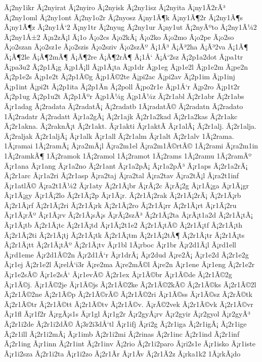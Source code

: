 {Ã¡2ny1ikr
Ã¡2nyirat
Ã¡2nyiro
Ã¡2nyisk
Ã¡2ny1isz
Ã¡2nyita
Ã¡ny1Ã­2rÃ³
Ã¡2ny1oml
Ã¡2ny1ont
Ã¡2ny1o2r
Ã¡2nyosz
Ã¡ny1Ã¶k
Ã¡ny1Ã¶2r
Ã¡2ny1Ã¶s
Ã¡ny1Ã¶z
Ã¡2ny1Å‘2
Ã¡ny1tr
Ã¡2nyug
Ã¡2ny1ur
Ã¡ny1ut
Ã¡2nyÃºto
Ã¡2ny1Ã¼2
Ã¡2ny1Å±2
Ã¡n2zÃ¡l
Ã¡1o
Ã¡o2cs
Ã¡o2kÃ¡
Ã¡o2ko
Ã¡o2mo
Ã¡o2pe
Ã¡o2so
Ã¡o2szan
Ã¡o2sz1e
Ã¡o2szis
Ã¡o2sziv
Ã¡o2szÃº
Ã¡1Ã³
Ã¡Ã³2ha
Ã¡Ã³2va
Ã¡1Ã¶
Ã¡Ã¶2le
Ã¡Ã¶2mÃ¶
Ã¡Ã¶2re
Ã¡Ã¶2rÃ¶
Ã¡1Å‘
Ã¡Å‘2sz
Ã¡2p1a2dot
Ã¡pa1tr
Ã¡pa3u2
Ã¡2p1Ã¡g
Ã¡p1Ã¡ll
Ã¡p1Ã¡ta
Ã¡p1dr
Ã¡p1eg
Ã¡p1e2l
Ã¡p1e2m
Ã¡pe2n
Ã¡2p1e2s
Ã¡p1e2t
Ã¡2p1Ã©g
Ã¡p1Ã©2te
Ã¡pi2ac
Ã¡pi2av
Ã¡2p1im
Ã¡p1inj
Ã¡p1int
Ã¡pi2t
Ã¡2p1ita
Ã¡2p1Ã­n
Ã¡2poll
Ã¡po2r1e
Ã¡p1Å‘r
Ã¡p2ro
Ã¡p1t2r
Ã¡2p1ug
Ã¡2p1u2t
Ã¡2p1Ãºr
Ã¡p1Ã¼g
Ã¡p1Ã¼z
Ã¡2r1abl
Ã¡2r1abr
Ã¡2r1abs
Ã¡r1adag
Ã¡2radata
Ã¡2radatÃ¡
Ã¡2radatb
1Ã¡radatÃ©
Ã¡2radatn
Ã¡2radato
1Ã¡2radatr
Ã¡2radatt
Ã¡r1a2gÃ¡
Ã¡2r1ajk
Ã¡2r1a2kad
Ã¡2r1a2kas
Ã¡2r1akc
Ã¡2r1akna.
Ã¡2raknÃ¡t
Ã¡2r1akt.
Ã¡r1akti
Ã¡r1aktÃ­
Ã¡r1alÃ¡
Ã¡2r1alj.
Ã¡2r1alja.
Ã¡2raljak
Ã¡2r1aljÃ¡
Ã¡r1alk
Ã¡r1all
Ã¡2r1alm
Ã¡r1alt
Ã¡2r1alv
1Ã¡2rama.
1Ã¡ramai
1Ã¡2ramÃ¡
Ã¡ra2mÃ¡l
Ã¡ra2m1el
Ã¡ra2m1Ã©rtÃ©
1Ã¡2rami
Ã¡ra2m1in
1Ã¡2ramkÃ¶
1Ã¡2ramok
1Ã¡2ramol
1Ã¡2ramot
1Ã¡2rams
1Ã¡2ramu
1Ã¡2ramÃº
Ã¡r1ana
Ã¡r1ang
Ã¡r1a2no
Ã¡2r1ant
Ã¡r1a2pÃ¡
Ã¡r1a2pÃ³
Ã¡r1aps
Ã¡2r1a2rÃ¡
Ã¡2r1arc
Ã¡r1a2ri
Ã¡2r1asp
Ã¡ra2taj
Ã¡ra2tal
Ã¡ra2tav
Ã¡ra2tÃ¡l
Ã¡ra2t1inf
Ã¡r1atlÃ©
Ã¡ra2t1Ã¼2
Ã¡r1aty
Ã¡2r1Ã¡br
Ã¡rÃ¡2c
Ã¡rÃ¡2g
Ã¡r1Ã¡ga
Ã¡r1Ã¡gr
Ã¡r1Ã¡gy
Ã¡r1Ã¡2lo
Ã¡2r1Ã¡2p
Ã¡r1Ã¡r.
Ã¡2r1Ã¡2rak
Ã¡2r1Ã¡2rÃ¡
Ã¡2r1Ã¡rb
Ã¡2r1Ã¡rf
Ã¡2r1Ã¡2ri
Ã¡2r1Ã¡rk
Ã¡2r1Ã¡2ro
Ã¡2r1Ã¡rr
Ã¡2r1Ã¡rt
Ã¡r1Ã¡2ru
Ã¡r1Ã¡rÃº
Ã¡r1Ã¡rv
Ã¡2r1Ã¡sÃ¡s
Ã¡rÃ¡2szÃ³
Ã¡2r1Ã¡2ta
Ã¡rÃ¡t1a2d
Ã¡2r1Ã¡tÃ¡
Ã¡r1Ã¡tb
Ã¡2r1Ã¡tc
Ã¡2r1Ã¡td
Ã¡r1Ã¡2t1e2
Ã¡2r1Ã¡tÃ©
Ã¡2r1Ã¡tf
Ã¡2r1Ã¡th
Ã¡2r1Ã¡2ti
Ã¡2r1Ã¡tj
Ã¡2r1Ã¡tk
Ã¡2r1Ã¡tm
Ã¡2r1Ã¡2tÃ¶
Ã¡2r1Ã¡tr
Ã¡2r1Ã¡ts
Ã¡2r1Ã¡tt
Ã¡2r1Ã¡tÃº
Ã¡2r1Ã¡tv
Ã¡r1bl
1Ã¡rboc
Ã¡r1br
Ã¡r2d1Ã¡l
Ã¡rd1ell
Ã¡rd1eme
Ã¡r2d1Ã©2n
Ã¡r2d1Å‘r
Ã¡r1drÃ¡
Ã¡r2dud
Ã¡re2Ã¡
Ã¡r1e2d
Ã¡2r1e2g
Ã¡r1ej
Ã¡2r1e2l
Ã¡relÅ‘i3r
Ã¡re2ma
Ã¡re2mÃ©l
Ã¡re2n
Ã¡r1ene
Ã¡r1eng
Ã¡2r1e2r
Ã¡r1e2sÃ©
Ã¡r1e2sÅ‘
Ã¡r1evÃ©
Ã¡2r1ex
Ã¡r1Ã©br
Ã¡r1Ã©de
Ã¡2r1Ã©2g
Ã¡r1Ã©j.
Ã¡r1Ã©2je
Ã¡r1Ã©js
Ã¡2r1Ã©2ke
Ã¡2r1Ã©2kÃ©
Ã¡2r1Ã©ks
Ã¡2r1Ã©2l
Ã¡2r1Ã©2ne
Ã¡2r1Ã©p
Ã¡2r1Ã©rÃ©
Ã¡2r1Ã©2ri
Ã¡r1Ã©ss
Ã¡r1Ã©sz
Ã¡2rÃ©tk
Ã¡2r1Ã©tr
Ã¡2r1Ã©tt
Ã¡2r1Ã©tv
Ã¡2r1Ã©v.
Ã¡rÃ©2vek
Ã¡2r1Ã©vk
Ã¡2r1Ã©vr
Ã¡r1fl
Ã¡r1f2r
Ã¡rgÃ¡s1s
Ã¡r1gl
Ã¡r1g2r
Ã¡r2gyÃ¡rv
Ã¡r2gyir
Ã¡r2gyol
Ã¡r2gyÃ³
Ã¡2r1i2de
Ã¡2r1i2dÃ©
Ã¡3r2i3dÅ‘tl
Ã¡r1ifj
Ã¡ri2g
Ã¡2r1iga
Ã¡2r1igÃ¡
Ã¡2r1ige
Ã¡2r1ill
Ã¡2r1i2mÃ¡
Ã¡r1imb
Ã¡2r1i2mi
Ã¡2rinas
Ã¡2r1inc
Ã¡2r1ind
Ã¡2r1inf
Ã¡2r1ing
Ã¡r1inn
Ã¡2r1int
Ã¡2r1inv
Ã¡2rio
Ã¡2r1i2paro
Ã¡ri2s1e
Ã¡r1isko
Ã¡r1iste
Ã¡r1i2sza
Ã¡2r1i2ta
Ã¡r1i2zo
Ã¡2r1Ã­r
Ã¡r1Ã­v
Ã¡2r1Ã­2z
Ã¡rka1k2
1Ã¡rkÃ¡do
}
